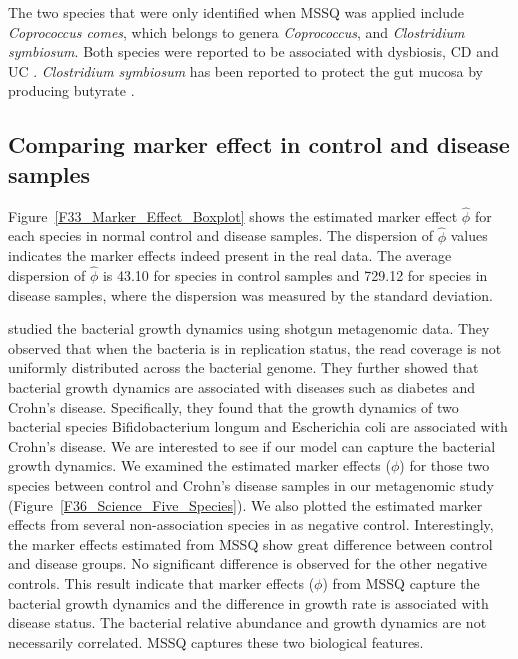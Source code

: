 The two species that were only identified when MSSQ was applied include  {\it Coprococcus comes}, which belongs to genera {\it Coprococcus}, and {\it Clostridium symbiosum}. Both  species were reported to be associated with dysbiosis, CD \citep{gevers2014treatment} and UC \citep{du2015development}.  {\it Clostridium symbiosum} has been reported to protect the gut mucosa by producing butyrate \citep{van2013butyrate}.


\subsection{Comparing marker effect in control and disease samples}
Figure~\ref{F33_Marker_Effect_Boxplot} shows the estimated marker effect $\hat{\phi}$ for each species in normal control and disease samples. The dispersion of $\hat{\phi}$ values indicates the marker effects indeed present in the real data. The average dispersion of $\hat{\phi}$ is 43.10 for species in control samples and 729.12 for species in disease samples, where the dispersion was measured by the standard deviation. 

\citet{Korem:2015cv} studied the bacterial growth dynamics using shotgun metagenomic data. They observed that when the bacteria is in replication status, the read coverage is not uniformly distributed across the bacterial genome. They further showed that bacterial growth dynamics are associated with diseases such as diabetes and Crohn's disease. Specifically, they found that the growth dynamics of two bacterial species Bifidobacterium longum and Escherichia coli are associated with Crohn's disease. We are interested to see if our model can capture the bacterial growth dynamics. We examined the estimated marker effects ($\phi$) for those two species between control and Crohn's disease samples in our metagenomic study (Figure~\ref{F36_Science_Five_Species}). We also plotted the estimated marker effects from several non-association species in \citet{Korem:2015cv} as negative control. Interestingly, the marker effects estimated from MSSQ show great difference between control and disease groups. No significant difference is observed for the other negative controls. This result indicate that marker effects ($\phi$) from MSSQ capture the bacterial growth dynamics and the difference in growth rate is associated with disease status. The bacterial relative abundance and growth dynamics are not necessarily correlated. MSSQ captures these two biological features.

